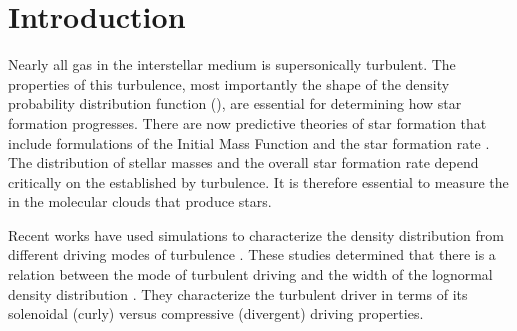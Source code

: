 

\ifstandalone

\fi


\section{Introduction}
Nearly all gas in the interstellar medium is supersonically turbulent.  The
properties of this turbulence, most importantly the shape of the density
probability distribution function (\rhoPDF), are essential for determining how star
formation progresses.
There are now predictive theories of star formation that include formulations
of the Initial Mass Function \citep[IMF;][]{Padoan2002a, Padoan2007a, Chabrier2010a, 
Elmegreen2011a, Hopkins2012b, Hennebelle2013a} and the star
formation rate
\citep[SFR;][]{Krumholz2005c,  Hennebelle2011a,
Padoan2011b, Krumholz2012b, Federrath2012a, Padoan2012a}.
The distribution of stellar masses and the overall star formation rate depend
critically on the \rhoPDF established by turbulence.  It is therefore essential to
measure the \rhoPDF in the molecular clouds that produce stars.

Recent works have used simulations to characterize the density distribution
from different driving modes of turbulence
\citep{Federrath2008a,Federrath2009a,Federrath2010a,Federrath2011a,Price2011b,Federrath2013a}.
These studies determined that there is a relation between the mode of turbulent driving and the width
of the lognormal density distribution
\citep{Padoan2011b,Molina2012a}.
They characterize the turbulent driver in terms of its solenoidal (curly) versus compressive (divergent)
driving properties. 

